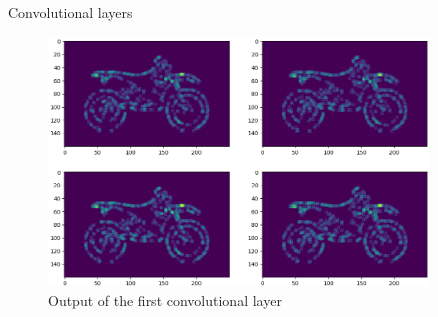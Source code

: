 \documentclass[10pt]{beamer}
\begin{document}
\begin{frame}{Convolutional layers}

\begin{figure}[!h]
	\centering
	\includegraphics[width=0.9\textwidth]{images/conv_output_slice3_cut}
	\caption{Output of the first convolutional layer}
\end{figure}

\end{frame}
\end{document}
